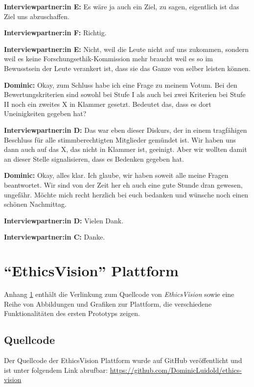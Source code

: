 \documentclass[a4paper,12pt,twoside,numbers=noendperiod]{scrreprt}
\begin{document}
\textbf{Interviewpartner:in E:} Es wäre ja auch ein Ziel, zu sagen, eigentlich ist das Ziel uns abzuschaffen.

\textbf{Interviewpartner:in F:} Richtig.

\textbf{Interviewpartner:in E:} Nicht, weil die Leute nicht auf uns zukommen, sondern weil es keine Forschungsethik-Kommission mehr braucht weil es so im Bewusstsein der Leute verankert ist, dass sie das Ganze von selber leisten können.

\textbf{Dominic:} Okay, zum Schluss habe ich eine Frage zu meinem Votum. Bei den Bewertungskriterien sind sowohl bei Stufe I als auch bei zwei Kriterien bei Stufe II noch ein zweites X in Klammer gesetzt. Bedeutet das, dass es dort Uneinigkeiten gegeben hat?

\textbf{Interviewpartner:in D:} Das war eben dieser Diskurs, der in einem tragfähigen Beschluss für alle stimmberechtigten Mitglieder gemündet ist. Wir haben uns dann auch auf das X, das nicht in Klammer ist, geeinigt. Aber wir wollten damit an dieser Stelle signalisieren, dass es Bedenken gegeben hat.

\textbf{Dominic:} Okay, alles klar. Ich glaube, wir haben soweit alle meine Fragen beantwortet. Wir sind von der Zeit her eh auch eine gute Stunde dran gewesen, ungefähr. Möchte mich recht herzlich bei euch bedanken und wünsche noch einen schönen Nachmittag.

\textbf{Interviewpartner:in D:} Vielen Dank.

\textbf{Interviewpartner:in C:} Danke.

\cleardoublepage
\chapter{\enquote{EthicsVision} Plattform}
\label{appendix:ethics-vision}

Anhang \ref{appendix:ethics-vision} enthält die Verlinkung zum Quellcode von \textit{EthicsVision} sowie eine Reihe von Abbildungen und Grafiken zur Plattform, die verschiedene Funktionalitäten des ersten Prototyps zeigen.

\section{Quellcode}
\label{appendix:ethics-vision-quellcode}

Der Quellcode der EthicsVision Plattform wurde auf GitHub veröffentlicht und ist unter folgendem Link abrufbar: \url{https://github.com/DominicLuidold/ethics-vision}
\end{document}
